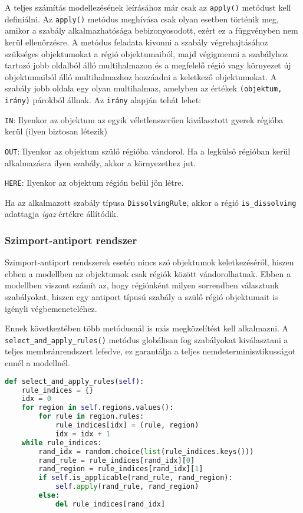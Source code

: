 A teljes számítás modellezésének leírásához már csak az \verb|apply()| metódust kell definiálni. Az \verb|apply()| metódus meghívása csak olyan esetben történik meg, amikor a szabály alkalmazhatósága bebizonyosodott, ezért ez a függvényben nem kerül ellenőrzésre. A metódus feladata kivonni a szabály végrehajtásához szükséges objektumokat a régió objektumaiból, majd végigmenni a szabályhoz tartozó jobb oldalból álló multihalmazon és a megfelelő régió vagy környezet új objektumaiból álló multihalmazhoz hozzáadni a keletkező objektumokat. A szabály jobb oldala egy olyan multihalmaz, amelyben az értékek \verb|(objektum, irány)| párokból állnak. 
Az \verb|irány| alapján tehát lehet:
\begin{compactenum}
\item \verb|IN|: Ilyenkor az objektum az egyik véletlenszerűen kiválasztott gyerek régióba kerül (ilyen biztosan létezik)
\item \verb|OUT|: Ilyenkor az objektum szülő régióba vándorol. Ha a legkülső régióban kerül alkalmazásra ilyen szabály, akkor a környezethez jut. 
\item \verb|HERE|: Ilyenkor az objektum régión belül jön létre.
\end{compactenum}

Ha az alkalmazott szabály típusa \verb|DissolvingRule|, akkor a régió \verb|is_dissolving| adattagja \textit{igaz} értékre állítódik.

\subsubsection{Szimport-antiport rendszer}

Szimport-antiport rendszerek esetén nincs szó objektumok keletkezéséről, hiszen ebben a modellben az objektumok csak régiók között vándorolhatnak. Ebben a modellben viszont számít az, hogy régiónként milyen sorrendben választunk szabályokat, hiszen egy antiport típusú szabály a szülő régió objektumait is igényli végbemeneteléhez. 


Ennek következtében több metódusnál is más megközelítést kell alkalmazni. A \verb|select_and_apply_rules()| metódus globálisan fog szabályokat kiválasztani a teljes membránrendszert lefedve, ez garantálja a teljes nemdeterminisztikusságot ennél a modellnél.

\begin{lstlisting}[language={Python}]
def select_and_apply_rules(self):
	rule_indices = {}
	idx = 0
	for region in self.regions.values():
		for rule in region.rules:
			rule_indices[idx] = (rule, region)
			idx = idx + 1
	while rule_indices:
		rand_idx = random.choice(list(rule_indices.keys()))
		rand_rule = rule_indices[rand_idx][0]
		rand_region = rule_indices[rand_idx][1]
		if self.is_applicable(rand_rule, rand_region):
			self.apply(rand_rule, rand_region)
		else:
			del rule_indices[rand_idx]
\end{lstlisting}

